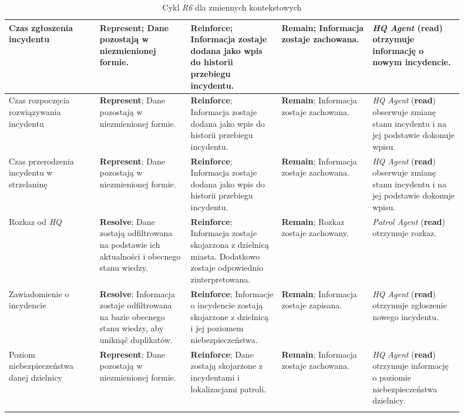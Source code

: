 \begin{landscape}
\begin{longtable}{|p{0.18\linewidth}|p{0.18\linewidth}|p{0.18\linewidth}|p{0.18\linewidth}|p{0.18\linewidth}|}
     \hline
     Czas zgłoszenia incydentu & \textbf{Represent}; Dane pozostają w niezmienionej formie. & \textbf{Reinforce}; Informacja zostaje dodana jako wpis do historii przebiegu incydentu. & \textbf{Remain}; Informacja zostaje zachowana. & \emph{HQ Agent} (\textbf{read}) otrzymuje informację o nowym incydencie. \\
     \hline
     Czas rozpoczęcia rozwiązywania incydentu & \textbf{Represent}; Dane pozostają w niezmienionej formie. & \textbf{Reinforce}; Informacja zostaje dodana jako wpis do historii przebiegu incydentu. & \textbf{Remain}; Informacja zostaje zachowana. & \emph{HQ Agent} (\textbf{read}) obserwuje zmianę stanu incydentu i na jej podstawie dokonuje wpisu. \\
     \hline
     Czas przerodzenia incydentu w strzelaninę & \textbf{Represent}; Dane pozostają w niezmienionej formie. & \textbf{Reinforce}; Informacja zostaje dodana jako wpis do historii przebiegu incydentu. & \textbf{Remain}; Informacja zostaje zachowana. & \emph{HQ Agent} (\textbf{read}) obserwuje zmianę stanu incydentu i na jej podstawie dokonuje wpisu. \\
     \hline
     Rozkaz od \emph{HQ}  & \textbf{Resolve}; Dane zostają odfiltrowana na podstawie ich aktualności i obecnego stanu wiedzy. & \textbf{Reinforce}; Informacja zostaje skojarzona z dzielnicą miasta. Dodatkowo zostaje odpowiednio zinterpretowana. & \textbf{Remain}; Rozkaz zostaje zachowany. & \emph{Patrol Agent} (\textbf{read}) otrzymuje rozkaz. \\
     \hline
     Zawiadomienie o incydencie  & \textbf{Resolve}; Informacja zostaje odfiltrowana na bazie obecnego stanu wiedzy, aby uniknąć duplikatów. & \textbf{Reinforce}; Informacje o incydencie zostają skojarzone z dzielnicą i jej poziomem niebezpieczeństwa. & \textbf{Remain}; Informacja zostaje zapisana. & \emph{HQ Agent} (\textbf{read}) otrzymuje zgłoszenie nowego incydentu. \\
     \hline
      Poziom niebezpieczeństwa danej dzielnicy &  \textbf{Represent}; Dane pozostają w niezmienionej formie. & \textbf{Reinforce}; Dane zostają skojarzone z incydentami i lokalizacjami patroli. & \textbf{Remain}; Informacja zostaje zachowana. & \emph{HQ Agent} (\textbf{read}) otrzymuje informację o poziomie niebezpieczeństwa dzielnicy. \\
      \hline
    \caption{Cykl \emph{R6} dla zmiennych kontekstowych}
    \label{tab:r6CycleForContextData}
    \end{longtable}
\end{landscape}


